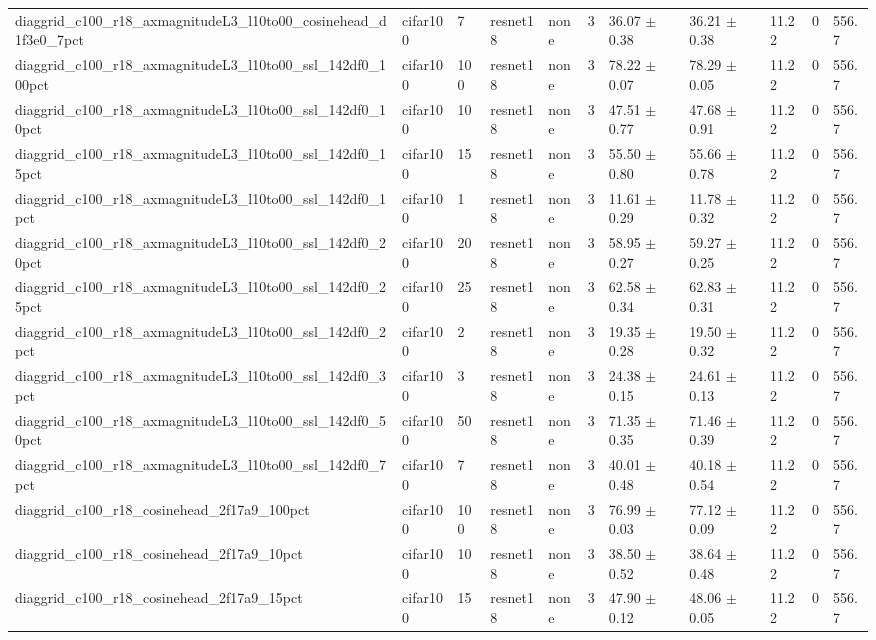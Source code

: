 \begin{tabular}{lllllllllll}
diaggrid_c100_r18_axmagnitudeL3_l10to00_cosinehead_d1f3e0_7pct & cifar100 & 7 & resnet18 & none & 3 & 36.07 $\pm$ 0.38 & 36.21 $\pm$ 0.38 & 11.22 & 0 & 556.7 \\
diaggrid_c100_r18_axmagnitudeL3_l10to00_ssl_142df0_100pct & cifar100 & 100 & resnet18 & none & 3 & 78.22 $\pm$ 0.07 & 78.29 $\pm$ 0.05 & 11.22 & 0 & 556.7 \\
diaggrid_c100_r18_axmagnitudeL3_l10to00_ssl_142df0_10pct & cifar100 & 10 & resnet18 & none & 3 & 47.51 $\pm$ 0.77 & 47.68 $\pm$ 0.91 & 11.22 & 0 & 556.7 \\
diaggrid_c100_r18_axmagnitudeL3_l10to00_ssl_142df0_15pct & cifar100 & 15 & resnet18 & none & 3 & 55.50 $\pm$ 0.80 & 55.66 $\pm$ 0.78 & 11.22 & 0 & 556.7 \\
diaggrid_c100_r18_axmagnitudeL3_l10to00_ssl_142df0_1pct & cifar100 & 1 & resnet18 & none & 3 & 11.61 $\pm$ 0.29 & 11.78 $\pm$ 0.32 & 11.22 & 0 & 556.7 \\
diaggrid_c100_r18_axmagnitudeL3_l10to00_ssl_142df0_20pct & cifar100 & 20 & resnet18 & none & 3 & 58.95 $\pm$ 0.27 & 59.27 $\pm$ 0.25 & 11.22 & 0 & 556.7 \\
diaggrid_c100_r18_axmagnitudeL3_l10to00_ssl_142df0_25pct & cifar100 & 25 & resnet18 & none & 3 & 62.58 $\pm$ 0.34 & 62.83 $\pm$ 0.31 & 11.22 & 0 & 556.7 \\
diaggrid_c100_r18_axmagnitudeL3_l10to00_ssl_142df0_2pct & cifar100 & 2 & resnet18 & none & 3 & 19.35 $\pm$ 0.28 & 19.50 $\pm$ 0.32 & 11.22 & 0 & 556.7 \\
diaggrid_c100_r18_axmagnitudeL3_l10to00_ssl_142df0_3pct & cifar100 & 3 & resnet18 & none & 3 & 24.38 $\pm$ 0.15 & 24.61 $\pm$ 0.13 & 11.22 & 0 & 556.7 \\
diaggrid_c100_r18_axmagnitudeL3_l10to00_ssl_142df0_50pct & cifar100 & 50 & resnet18 & none & 3 & 71.35 $\pm$ 0.35 & 71.46 $\pm$ 0.39 & 11.22 & 0 & 556.7 \\
diaggrid_c100_r18_axmagnitudeL3_l10to00_ssl_142df0_7pct & cifar100 & 7 & resnet18 & none & 3 & 40.01 $\pm$ 0.48 & 40.18 $\pm$ 0.54 & 11.22 & 0 & 556.7 \\
diaggrid_c100_r18_cosinehead_2f17a9_100pct & cifar100 & 100 & resnet18 & none & 3 & 76.99 $\pm$ 0.03 & 77.12 $\pm$ 0.09 & 11.22 & 0 & 556.7 \\
diaggrid_c100_r18_cosinehead_2f17a9_10pct & cifar100 & 10 & resnet18 & none & 3 & 38.50 $\pm$ 0.52 & 38.64 $\pm$ 0.48 & 11.22 & 0 & 556.7 \\
diaggrid_c100_r18_cosinehead_2f17a9_15pct & cifar100 & 15 & resnet18 & none & 3 & 47.90 $\pm$ 0.12 & 48.06 $\pm$ 0.05 & 11.22 & 0 & 556.7 \\

\end{tabular}
